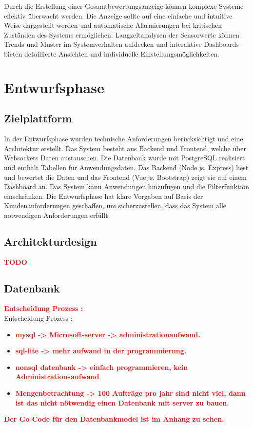 \begin{flushleft}
Durch die Erstellung einer Gesamtbewertungsanzeige können komplexe Systeme effektiv überwacht werden. Die Anzeige sollte auf eine einfache und intuitive Weise dargestellt werden und automatische Alarmierungen bei kritischen Zuständen des Systems ermöglichen. Langzeitanalysen der Sensorwerte können Trends und Muster im Systemverhalten aufdecken und interaktive Dashboards bieten detaillierte Ansichten und individuelle Einstellungsmöglichkeiten.
\section{Entwurfsphase}
\subsection{Zielplattform}
In der Entwurfsphase wurden technische Anforderungen berücksichtigt und eine Architektur erstellt. Das System besteht aus Backend und Frontend, welche über Websockets Daten austauschen. Die Datenbank wurde mit PostgreSQL realisiert und enthält Tabellen für Anwendungsdaten. Das Backend (Node.js, Express) liest und bewertet die Daten und das Frontend (Vue.js, Bootstrap) zeigt sie auf einem Dashboard an. Das System kann Anwendungen hinzufügen und die Filterfunktion einschränken. Die Entwurfsphase hat klare Vorgaben auf Basis der Kundenanforderungen geschaffen, um sicherzustellen, dass das System alle notwendigen Anforderungen erfüllt.
\subsection{Architekturdesign}
\textcolor{red}{\textbf{TODO}}\\
\subsection{Datenbank}
\textcolor{red}{\textbf{Entscheidung Prozess :}}\\
Entscheidung Prozess :
\begin{itemize}
\item \textcolor{red}{\textbf{mysql -> Microsoft-server -> administrationaufwand.}}
\item \textcolor{red}{\textbf{ sql-lite -> mehr aufwand in der programmierung.}}
\item \textcolor{red}{\textbf{ nonsql datenbank -> einfach programmieren, kein Administrationsaufwand}}
\item \textcolor{red}{\textbf{ Mengenbetrachtung -> 100 Aufträge pro jahr sind nicht viel, dann ist das nicht nötwendig einen Datenbank mit server zu bauen.}}
\end{itemize}
\textcolor{red}{\textbf{Der Go-Code für den Datenbankmodel ist im Anhang zu sehen.}}

\end{flushleft}
